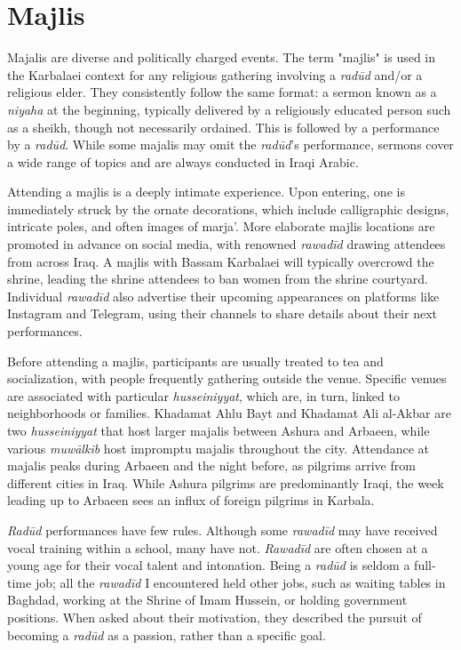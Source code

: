 \section{Majlis} \label{majlis}
Majalis are diverse and politically charged events. The term "majlis" is used in the Karbalaei context for any religious gathering involving a \emph{radūd} and/or a religious elder. They consistently follow the same format: a sermon known as a \emph{niyaha} at the beginning, typically delivered by a religiously educated person such as a sheikh, though not necessarily ordained. This is followed by a performance by a \emph{radūd}. While some majalis may omit the \emph{radūd}'s performance, sermons cover a wide range of topics and are always conducted in Iraqi Arabic.

Attending a majlis is a deeply intimate experience. Upon entering, one is immediately struck by the ornate decorations, which include calligraphic designs, intricate poles, and often images of marja'. More elaborate majlis locations are promoted in advance on social media, with renowned \emph{rawadīd} drawing attendees from across Iraq. A majlis with Bassam Karbalaei will typically overcrowd the shrine, leading the shrine attendees to ban women from the shrine courtyard. Individual \emph{rawadīd} also advertise their upcoming appearances on platforms like Instagram and Telegram, using their channels to share details about their next performances.

Before attending a majlis, participants are usually treated to tea and socialization, with people frequently gathering outside the venue. Specific venues are associated with particular \emph{husseiniyyat}, which are, in turn, linked to neighborhoods or families. Khadamat Ahlu Bayt and Khadamat Ali al-Akbar are two \emph{husseiniyyat} that host larger majalis between Ashura and Arbaeen, while various \emph{muwālkib} host impromptu majalis throughout the city. Attendance at majalis peaks during Arbaeen and the night before, as pilgrims arrive from different cities in Iraq. While Ashura pilgrims are predominantly Iraqi, the week leading up to Arbaeen sees an influx of foreign pilgrims in Karbala.

\emph{Radūd} performances have few rules. Although some \emph{rawadīd} may have received vocal training within a school, many have not. \emph{Rawadīd} are often chosen at a young age for their vocal talent and intonation. Being a \emph{radūd} is seldom a full-time job; all the \emph{rawadīd} I encountered held other jobs, such as waiting tables in Baghdad, working at the Shrine of Imam Hussein, or holding government positions. When asked about their motivation, they described the pursuit of becoming a \emph{radūd} as a passion, rather than a specific goal.

